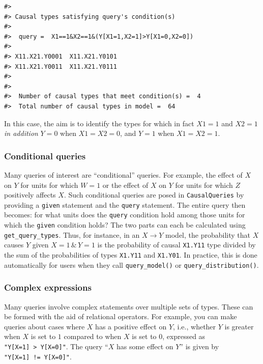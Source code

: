 \documentclass[
  11pt,
  article]{jss}
\begin{document}
\begin{verbatim}
#> 
#> Causal types satisfying query's condition(s)  
#> 
#>  query =  X1==1&X2==1&(Y[X1=1,X2=1]>Y[X1=0,X2=0]) 
#> 
#> X11.X21.Y0001  X11.X21.Y0101
#> X11.X21.Y0011  X11.X21.Y0111
#> 
#> 
#>  Number of causal types that meet condition(s) =  4
#>  Total number of causal types in model =  64
\end{verbatim}

In this case, the aim is to identify the types for which in fact
\(X1=1\) and \(X2=1\) \emph{in addition} \(Y=0\) when \(X1 = X2 = 0\),
and \(Y = 1\) when \(X1 = X2 = 1\).

\subsubsection{Conditional queries}\label{conditional-queries}

Many queries of interest are ``conditional'' queries. For example, the
effect of \(X\) on \(Y\) for units for which \(W= 1\) or the effect of
\(X\) on \(Y\) for units for which \(Z\) positively affects \(X\). Such
conditional queries are posed in \texttt{CausalQueries} by providing a
\texttt{given} statement and the \texttt{query} statement. The entire
query then becomes: for what units does the \texttt{query} condition
hold among those units for which the \texttt{given} condition holds? The
two parts can each be calculated using \texttt{get\_query\_types}. Thus,
for instance, in an \(X \rightarrow Y\) model, the probability that
\(X\) causes \(Y\) given \(X=1 \, \& \, Y=1\) is the probability of
causal \texttt{X1.Y11} type divided by the sum of the probabilities of
types \texttt{X1.Y11} and \texttt{X1.Y01}. In practice, this is done
automatically for users when they call \texttt{query\_model()} or
\texttt{query\_distribution()}.

\subsubsection{Complex expressions}\label{complex-expressions}

Many queries involve complex statements over multiple sets of types.
These can be formed with the aid of relational operators. For example,
you can make queries about cases where \(X\) has a positive effect on
\(Y\), i.e., whether \(Y\) is greater when \(X\) is set to \(1\)
compared to when \(X\) is set to \(0\), expressed as
\texttt{"Y{[}X=1{]}\ \textgreater{}\ Y{[}X=0{]}"}. The query ``\(X\) has
some effect on \(Y\)'' is given by
\texttt{"Y{[}X=1{]}\ !=\ Y{[}X=0{]}"}.
\end{document}
